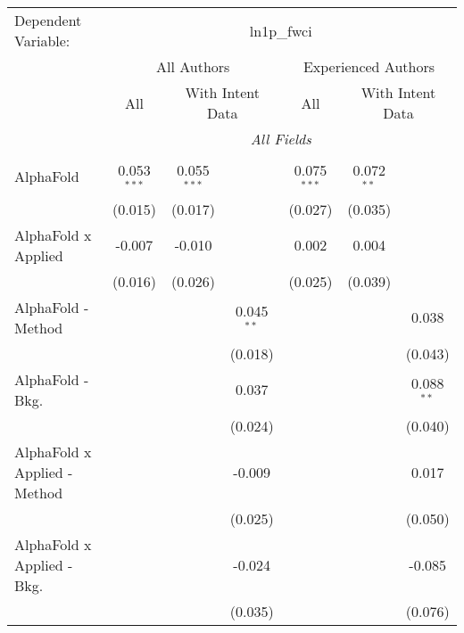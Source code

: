 \begingroup
\centering
\begin{tabular}{lcccccc}
   \tabularnewline \midrule \midrule
   Dependent Variable: & \multicolumn{6}{c}{ln1p\_fwci}\\
 & \multicolumn{3}{c}{All Authors} & \multicolumn{3}{c}{Experienced Authors} \\
\cmidrule(lr){2-4} \cmidrule(lr){5-7}
 & \multicolumn{1}{c}{All} & \multicolumn{2}{c}{With Intent Data} & \multicolumn{1}{c}{All} & \multicolumn{2}{c}{With Intent Data} \\
\cmidrule(lr){2-2} \cmidrule(lr){3-4} \cmidrule(lr){5-5} \cmidrule(lr){6-7}
 & \multicolumn{6}{c}{\textit{All Fields}} \\ \\
   AlphaFold                      & 0.053$^{***}$ & 0.055$^{***}$ &              & 0.075$^{***}$ & 0.072$^{**}$ &   \\   
                                  & (0.015)       & (0.017)       &              & (0.027)       & (0.035)      &   \\   
   AlphaFold x Applied            & -0.007        & -0.010        &              & 0.002         & 0.004        &   \\   
                                  & (0.016)       & (0.026)       &              & (0.025)       & (0.039)      &   \\   
   AlphaFold - Method             &               &               & 0.045$^{**}$ &               &              & 0.038\\   
                                  &               &               & (0.018)      &               &              & (0.043)\\   
   AlphaFold - Bkg.               &               &               & 0.037        &               &              & 0.088$^{**}$\\   
                                  &               &               & (0.024)      &               &              & (0.040)\\   
   AlphaFold x Applied - Method   &               &               & -0.009       &               &              & 0.017\\   
                                  &               &               & (0.025)      &               &              & (0.050)\\   
   AlphaFold x Applied - Bkg.     &               &               & -0.024       &               &              & -0.085\\   
                                  &               &               & (0.035)      &               &              & (0.076)\\   

\end{tabular}
